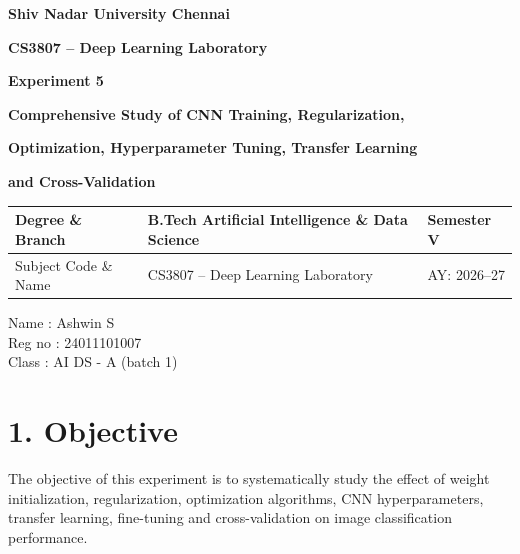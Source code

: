 \documentclass[10pt]{article}
\begin{document}

\begin{center}

{\large\textbf{Shiv Nadar University Chennai}}

\vspace{2mm}

{\normalsize\textbf{CS3807 -- Deep Learning Laboratory}}

\vspace{2mm}

{\large\textbf{Experiment 5}}

\vspace{1mm}

{\normalsize\textbf{Comprehensive Study of CNN Training, Regularization,}}

{\normalsize\textbf{Optimization, Hyperparameter Tuning, Transfer Learning}}

{\normalsize\textbf{and Cross-Validation}}

\end{center}

\vspace{3mm}

\begin{tabular}{|p{3.4cm}|p{9.0cm}|p{1.4cm}|}
\hline
Degree \& Branch &
B.Tech Artificial Intelligence \& Data Science &
Semester V\\
\hline
Subject Code \& Name &
CS3807 -- Deep Learning Laboratory &
AY: 2026--27\\
\hline
\end{tabular}

\vspace{4mm}
Name : Ashwin S\\
Reg no : 24011101007\\
Class : AI DS - A (batch 1)\\

\section*{1. Objective}

The objective of this experiment is to systematically study the effect of
weight initialization, regularization, optimization algorithms, CNN
hyperparameters, transfer learning, fine-tuning and cross-validation on
image classification performance.
\end{document}
